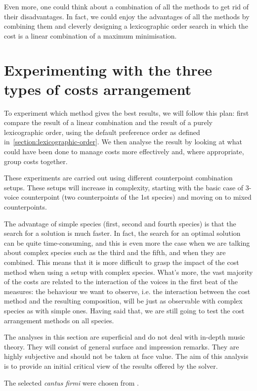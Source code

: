 Even more, one could think about a combination of all the methods to get rid of their disadvantages. In fact, we could enjoy the advantages of all the methods by combining them and cleverly designing a lexicographic order search in which the cost is a linear combination of a maximum minimisation.

\section{Experimenting with the three types of costs arrangement}
To experiment which method gives the best results, we will follow this plan: first compare the result of a linear combination and the result of a purely lexicographic order, using the default preference order as defined in~\ref{section:lexicographic-order}. We then analyse the result by looking at what could have been done to manage costs more effectively and, where appropriate, group costs together.

These experiments are carried out using different counterpoint combination setups. These setups will increase in complexity, starting with the basic case of 3-voice counterpoint (two counterpoints of the 1st species) and moving on to mixed counterpoints. 

The advantage of simple species (first, second and fourth species) is that the search for a solution is much faster. In fact, the search for an optimal solution can be quite time-consuming, and this is even more the case when we are talking about complex species such as the third and the fifth, and when they are combined. This means that it is more difficult to grasp the impact of the cost method when using a setup with complex species. What's more, the vast majority of the costs are related to the interaction of the voices in the first beat of the measures: the behaviour we want to observe, i.e. the interaction between the cost method and the resulting composition, will be just as observable with complex species as with simple ones. Having said that, we are still going to test the cost arrangement methods on all species.

The analyses in this section are superficial and do not deal with in-depth music theory. They will consist of general surface and impression remarks. They are highly subjective and should not be taken at face value. The aim of this analysis is to provide an initial critical view of the results offered by the solver.

The selected \textit{cantus firmi} were chosen from \gap. 
